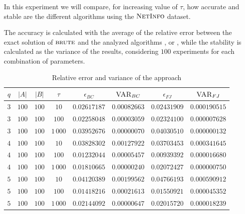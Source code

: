 In this experiment we will compare, for increasing value of $\tau$, how accurate and stable are the different algorithms using the $\textsc{NetInfo}$ dataset.\medskip

The accuracy is calculated with the average of the relative error between the exact solution of $\textsc{brute}$ and the analyzed algorithms \fcount, \fsamp or \base, while the stability is calculated as the variance of the results, considering $100$ experiments for each combination of parameters.

\begin{table}[h]
	\centering
	\begin{tabular}{|c|c|c|c|c|c|c|c|}
		\hline
		$q$ & $|A|$ & $|B|$ & $\tau$      & $\epsilon_{BC}$ & $\textsc{VAR}_{BC}$ & $\epsilon_{FJ}$ & $\textsc{VAR}_{FJ}$ \\ \hline \hline
		$3$ & $100$ & $100$ & $10$     & $0.02617187$    & $0.00082663$        & $0.02431909$    & $0.000190515$       \\ \hline
		$3$ & $100$ & $100$ & $100$    & $0.02258048$    & $0.00003059$        & $0.02324100$    & $0.000007628$       \\ \hline
		$3$ & $100$ & $100$ & $1\,000$ & $0.03952676$    & $0.00000070$        & $0.04030510$    & $0.000000132$       \\ \hline \hline
		$4$ & $100$ & $100$ & $10$     & $0.03828302$    & $0.00127922$        & $0.03703453$    & $0.000341645$       \\ \hline
		$4$ & $100$ & $100$ & $100$    & $0.01232044$    & $0.00005457$        & $0.00939392$    & $0.000016680$       \\ \hline
		$4$ & $100$ & $100$ & $1\,000$ & $0.01810665$    & $0.00000240$        & $0.02072427$    & $0.000000750$       \\ \hline \hline
		$5$ & $100$ & $100$ & $10$     & $0.04120389$    & $0.00199562$        & $0.04766193$    & $0.000590912$       \\ \hline
		$5$ & $100$ & $100$ & $100$    & $0.01418216$    & $0.00021613$        & $0.01550921$    & $0.000045352$       \\ \hline
		$5$ & $100$ & $100$ & $1\,000$ & $0.02144092$    & $0.00000647$        & $0.02015720$    & $0.000018239$       \\ \hline
		
	\end{tabular}
	\caption{Relative error and variance of the \fcount approach}	
\end{table}

